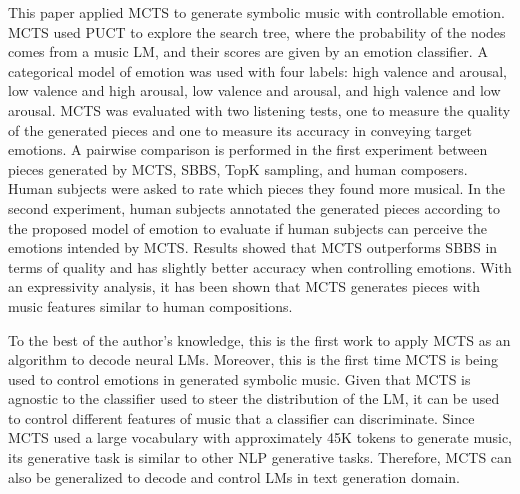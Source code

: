 This paper applied MCTS to generate symbolic music with controllable emotion. MCTS used PUCT to explore the search tree, where the probability of the nodes comes from a music LM, and their scores are given by an emotion classifier. A categorical model of emotion was used with four labels: high valence and arousal, low valence and high arousal, low valence and arousal, and high valence and low arousal. MCTS was evaluated with two listening tests, one to measure the quality of the generated pieces and one to measure its accuracy in conveying target emotions. A pairwise comparison is performed in the first experiment between pieces generated by MCTS, SBBS, TopK sampling, and human composers. Human subjects were asked to rate which pieces they found more musical. In the second experiment, human subjects annotated the generated pieces according to the proposed model of emotion to evaluate if human subjects can perceive the emotions intended by MCTS. Results showed that MCTS outperforms SBBS in terms of quality and has slightly better accuracy when controlling emotions. With an expressivity analysis, it has been shown that MCTS generates pieces with music features similar to human compositions.

To the best of the author's knowledge, this is the first work to apply MCTS as an algorithm to decode neural LMs. Moreover, this is the first time MCTS is being used to control emotions in generated symbolic music. Given that MCTS is agnostic to the classifier used to steer the distribution of the LM, it can be used to control different features of music that a classifier can discriminate. Since MCTS used a large vocabulary with approximately 45K tokens to generate music, its generative task is similar to other NLP generative tasks. Therefore, MCTS can also be generalized to decode and control LMs in text generation domain.
